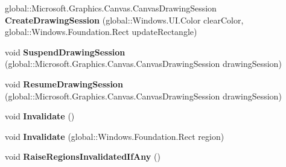 \begin{DoxyCompactItemize}
\item 
\mbox{\label{interface_microsoft_1_1_graphics_1_1_canvas_1_1_u_i_1_1_xaml_1_1_i_canvas_virtual_image_source_a0dca36de10b0621fa57400291c8ac8e0}} 
global\+::\+Microsoft.\+Graphics.\+Canvas.\+Canvas\+Drawing\+Session {\bfseries Create\+Drawing\+Session} (global\+::\+Windows.\+U\+I.\+Color clear\+Color, global\+::\+Windows.\+Foundation.\+Rect update\+Rectangle)
\item 
\mbox{\label{interface_microsoft_1_1_graphics_1_1_canvas_1_1_u_i_1_1_xaml_1_1_i_canvas_virtual_image_source_a04c5d24777624a8eeb7d282703e2f97a}} 
void {\bfseries Suspend\+Drawing\+Session} (global\+::\+Microsoft.\+Graphics.\+Canvas.\+Canvas\+Drawing\+Session drawing\+Session)
\item 
\mbox{\label{interface_microsoft_1_1_graphics_1_1_canvas_1_1_u_i_1_1_xaml_1_1_i_canvas_virtual_image_source_a501ef07bf7ed03a1dbaf87016f789ac5}} 
void {\bfseries Resume\+Drawing\+Session} (global\+::\+Microsoft.\+Graphics.\+Canvas.\+Canvas\+Drawing\+Session drawing\+Session)
\item 
\mbox{\label{interface_microsoft_1_1_graphics_1_1_canvas_1_1_u_i_1_1_xaml_1_1_i_canvas_virtual_image_source_a73580d63c0dbcf49067c8188bbc17f11}} 
void {\bfseries Invalidate} ()
\item 
\mbox{\label{interface_microsoft_1_1_graphics_1_1_canvas_1_1_u_i_1_1_xaml_1_1_i_canvas_virtual_image_source_a8abbf69a507cfa89ef9d4a6b113d2fbb}} 
void {\bfseries Invalidate} (global\+::\+Windows.\+Foundation.\+Rect region)
\item 
\mbox{\label{interface_microsoft_1_1_graphics_1_1_canvas_1_1_u_i_1_1_xaml_1_1_i_canvas_virtual_image_source_a4a0609ae8d5cff634e5c29e0a749f233}} 
void {\bfseries Raise\+Regions\+Invalidated\+If\+Any} ()

\end{DoxyCompactItemize}
